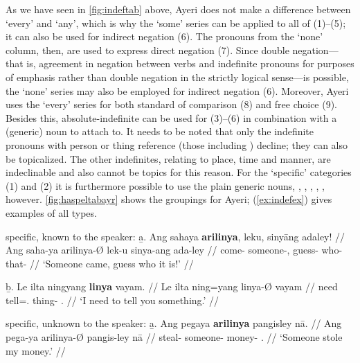As we have seen in \autoref{fig:indeftab} above, Ayeri does not make a 
difference between `every' and `any', which is why the `some' series can be 
applied to all of (1)--(5); it can also be used for indirect negation (6). The 
pronouns from the `none' column, then, are used to express direct negation (7). 
Since double negation---that is, agreement in negation between verbs and 
indefinite pronouns for purposes of emphasis rather than double negation in the 
strictly logical sense---is possible, the `none' series may also be employed 
for indirect negation (6). Moreover, Ayeri uses the `every' series for both 
standard of comparison (8) and free choice (9). Besides this, 
absolute-indefinite  can be used for (3)--(6) in combination 
with a (generic) noun to attach to. It needs to be noted that only the 
indefinite pronouns with person or thing reference (those including 
) decline; they can also be topicalized. The other indefinites, 
relating to place, time and manner, are indeclinable and also cannot be topics 
for this reason.
%
%
For the `specific' categories (1) and (2) it is furthermore possible to use the 
plain generic nouns, , , 
, , , 
however. \autoref{fig:haspeltabayr} shows the groupings for Ayeri; 
(\ref{ex:indefex}) gives examples of all types.

\pex[labeltype=numeric,interpartskip=1em]\label{ex:indefex}
\a specific, known to the speaker:\vspace{.5em} %
	\beginsubsub
	\b{a.} \begingl
		\gla Ang sahaya \textbf{arilinya}, leku, sinyāng adaley! //
		\glb Ang saha-ya arilinya-Ø lek-u sinya-ang ada-ley //
		\glc \AgtT{} come-\TsgM{} someone-\Top{}, guess-\Imp{} 
			who-\Aarg{} that-\PargI{} //
		\glft `Someone came, guess who it is!' //
		\endgl\vspace{.5em}
		
	\b{b.} \begingl
		\gla Le ilta ningyang \textbf{linya} vayam. //
		\glb Le ilta ning=yang linya-Ø vayam //
		\glc \PatTI{} need tell=\Fsg{}.\Aarg{} thing-\Top{} 
			\Ssg{}.\Dat{} //
		\glft `I need to tell you something.' //
		\endgl
	\endsubsub

\a specific, unknown to the speaker:\vspace{.5em} %
	\beginsubsub
	\b{a.} \begingl
		\gla Ang pegaya \textbf{arilinya} pangisley nā. //
		\glb Ang pega-ya arilinya-Ø pangis-ley nā //
		\glc \AgtT{} steal-\TsgM{} someone-\Top{} money-\PargI{} 
			\Fsg{}.\Gen{} //
		\glft `Someone stole my money.' //
		\endgl\vspace{.5em}
		
